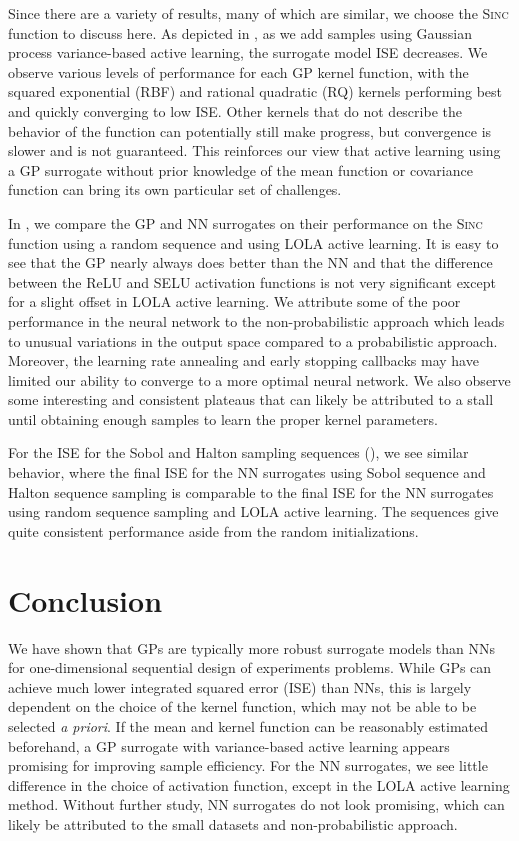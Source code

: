 \documentclass[conference,final]{IEEEtran}
\begin{document}
	Since there are a variety of results, many of which are similar, we choose the \textsc{Sinc} function to discuss here. As depicted in , as we add samples using Gaussian process variance-based active learning, the surrogate model ISE decreases. We observe various levels of performance for each GP kernel function, with the squared exponential (RBF) and rational quadratic (RQ) kernels performing best and quickly converging to low ISE. Other kernels that do not describe the behavior of the function can potentially still make progress, but convergence is slower and is not guaranteed. This reinforces our view that active learning using a GP surrogate without prior knowledge of the mean function or covariance function can bring its own particular set of challenges.
	
	In , we compare the GP and NN surrogates on their performance on the \textsc{Sinc} function using a random sequence and using LOLA active learning. It is easy to see that the GP nearly always does better than the NN and that the difference between the ReLU and SELU activation functions is not very significant except for a slight offset in LOLA active learning. We attribute some of the poor performance in the neural network to the non-probabilistic approach which leads to unusual variations in the output space compared to a probabilistic approach. Moreover, the learning rate annealing and early stopping callbacks may have limited our ability to converge to a more optimal neural network. We also observe some interesting and consistent plateaus that can likely be attributed to a stall until obtaining enough samples to learn the proper kernel parameters.
	
	For the ISE for the Sobol and Halton sampling sequences (), we see similar behavior, where the final ISE for the NN surrogates using Sobol sequence and Halton sequence sampling is comparable to the final ISE for the NN surrogates using random sequence sampling and LOLA active learning. The sequences give quite consistent performance aside from the random initializations.
	
	\section{Conclusion}
	\label{sec:conclusion}
	
	We have shown that GPs are typically more robust surrogate models than NNs for one-dimensional sequential design of experiments problems. While GPs can achieve much lower integrated squared error (ISE) than NNs, this is largely dependent on the choice of the kernel function, which may not be able to be selected \textit{a priori}. If the mean and kernel function can be reasonably estimated beforehand, a GP surrogate with variance-based active learning appears promising for improving sample efficiency. For the NN surrogates, we see little difference in the choice of activation function, except in the LOLA active learning method. Without further study, NN surrogates do not look promising, which can likely be attributed to the small datasets and non-probabilistic approach.
	
\end{document}
